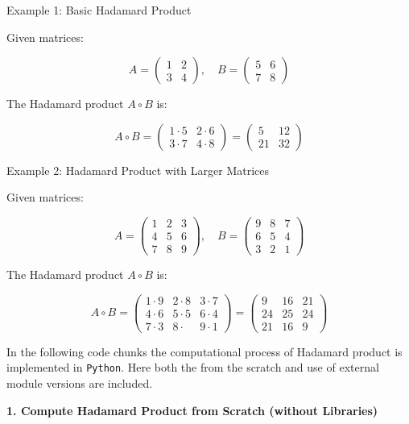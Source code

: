 \documentclass[
  letterpaper,
  DIV=11,
  numbers=noendperiod]{scrreprt}
\theoremstyle{plain}
\theoremstyle{definition}
\theoremstyle{remark}
\begin{document}
Example 1: Basic Hadamard Product

Given matrices:

\[A = \begin{pmatrix}1 & 2 \\3 & 4\end{pmatrix}, \quad B = \begin{pmatrix}5 & 6 \\7 & 8\end{pmatrix}\]

The Hadamard product \(A \circ B\) is:

\[A \circ B = \begin{pmatrix}1 \cdot 5 & 2 \cdot 6 \\3 \cdot 7 & 4 \cdot 8\end{pmatrix} = \begin{pmatrix}5 & 12 \\21 & 32\end{pmatrix}\]

Example 2: Hadamard Product with Larger Matrices

Given matrices:

\[A = \begin{pmatrix}1 & 2 & 3 \\4 & 5 & 6 \\7 & 8 & 9\end{pmatrix}, \quad B = \begin{pmatrix}9 & 8 & 7 \\6 & 5 & 4 \\3 & 2 & 1\end{pmatrix}\]

The Hadamard product \(A \circ B\) is:

\[A \circ B = \begin{pmatrix}1 \cdot 9 & 2 \cdot 8 & 3 \cdot 7 \\4 \cdot 6 & 5 \cdot 5 & 6 \cdot 4 \\7 \cdot 3 & 8 \cdot  & 9 \cdot 1\end{pmatrix} = \begin{pmatrix}9 & 16 & 21 \\24 & 25 & 24 \\21 & 16 & 9\end{pmatrix}\]

In the following code chunks the computational process of Hadamard
product is implemented in \texttt{Python}. Here both the from the
scratch and use of external module versions are included.

\textbf{1. Compute Hadamard Product from Scratch (without Libraries)}
\end{document}
